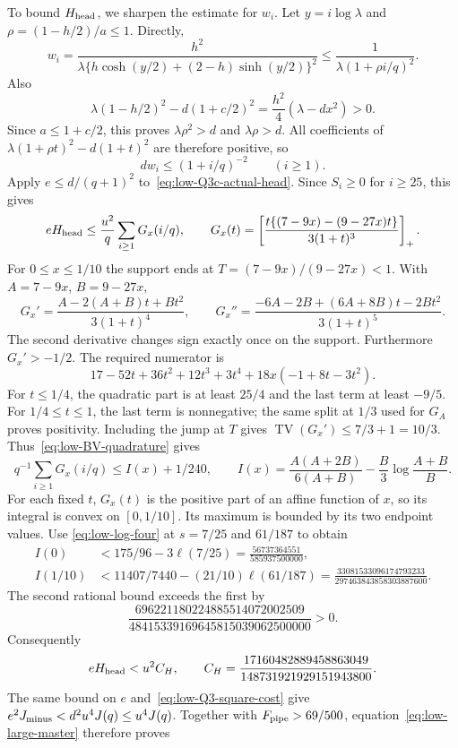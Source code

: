 To bound $H_{\rm head}$, we sharpen the estimate for $w_i$. Let
$y=i\log\lambda$ and $\rho=(1-h/2)/a\le1$.  Directly,
\[
 w_i=\frac{h^2}{\lambda
       \{h\cosh(y/2)+(2-h)\sinh(y/2)\}^2}
 \le\frac1{\lambda(1+\rho i/q)^2}.
\]
Also
\[
 \lambda(1-h/2)^2-d(1+c/2)^2
                  =\frac{h^2}{4}(\lambda-dx^2)>0.
\]
Since $a\le1+c/2$, this proves $\lambda\rho^2>d$ and
$\lambda\rho>d$.  All coefficients of
$\lambda(1+\rho t)^2-d(1+t)^2$ are therefore positive, so
\begin{equation}\label{eq:low-Q3c-weight}
 d w_i\le(1+i/q)^{-2}\qquad(i\ge1).
\end{equation}
Apply $e\le d/(q+1)^2$ to~\eqref{eq:low-Q3c-actual-head}.
Since $S_i\ge0$ for $i\ge25$, this gives
\[
 eH_{\rm head}\le\frac{u^2}{q}\sum_{i\ge1}G_x(i/q),\qquad
 G_x(t)=\left[\frac{t\{(7-9x)-(9-27x)t\}}{3(1+t)^3}\right]_+.
\]
For $0\le x\le1/10$ the support ends at
$T=(7-9x)/(9-27x)<1$.  With $A=7-9x$, $B=9-27x$,
\[
 G_x'=\frac{A-2(A+B)t+Bt^2}{3(1+t)^4},\qquad
 G_x''=\frac{-6A-2B+(6A+8B)t-2Bt^2}{3(1+t)^5}.
\]
The second derivative changes sign exactly once on the support.
Furthermore $G_x'>-1/2$.  The required numerator is
\[
 17-52t+36t^2+12t^3+3t^4+18x(-1+8t-3t^2).
\]
For $t\le1/4$, the quadratic part is at least $25/4$ and the
last term at least $-9/5$.  For $1/4\le t\le1$, the last
term is nonnegative; the same split at $1/3$ used for $G_A$
proves positivity.  Including the jump at $T$ gives
$\operatorname{TV}(G_x')\le7/3+1=10/3$.
Thus~\eqref{eq:low-BV-quadrature} gives
\[
 q^{-1}\sum_{i\ge1}G_x(i/q)\le I(x)+1/240,\qquad
 I(x)=\frac{A(A+2B)}{6(A+B)}-\frac B3\log\frac{A+B}{B}.
\]
For each fixed $t$, $G_x(t)$ is the positive part of an affine
function of $x$, so its integral is convex on $[0,1/10]$.
Its maximum is bounded by its two endpoint values.  Use
\eqref{eq:low-log-four} at $s=7/25$ and $61/187$ to obtain
\begin{align*}
 I(0)&<175/96-3\ell(7/25)=\frac{56737364551}{585937500000},\\
 I(1/10)&<11407/7440-(21/10)\ell(61/187)
              =\frac{33081533096174793233}{297463843858303887600}.
\end{align*}
The second rational bound exceeds the first by
\[
 \frac{696221180224885514072002509}{48415339169645815039062500000}>0.
\]
Consequently
\[
 eH_{\rm head}<u^2C_H,\qquad
 C_H=\frac{17160482889458863049}{148731921929151943800}.
\]
The same bound on $e$ and~\eqref{eq:low-Q3-square-cost} give
$e^2J_{\rm minus}<d^2u^4J(q)\le u^4J(q)$.
Together with $F_{\rm pipe}>69/500$, equation~\eqref{eq:low-large-master}
therefore proves
